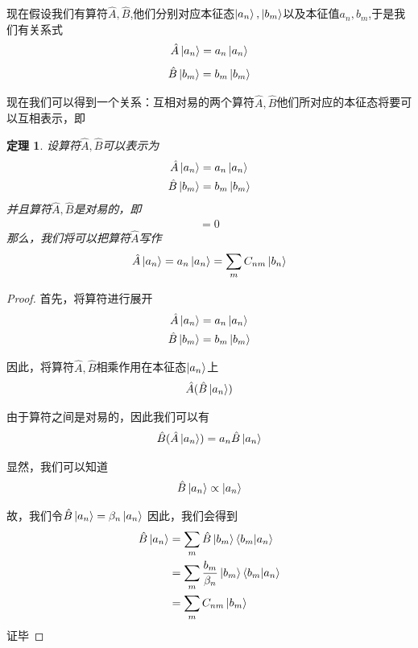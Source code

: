 \documentclass{article}
\newtheorem{theorem}{定理}
\begin{document}
现在假设我们有算符$\hat{A},\hat{B}$,他们分别对应本征态$\ket{a_n},\ket{b_m}$以及本征值$a_n,b_m$,于是我们有关系式
\[\hat{A}\ket{a_n}=a_n\ket{a_n}\]
\[\hat{B}\ket{b_m}=b_m\ket{b_m}\]

现在我们可以得到一个关系：互相对易的两个算符$\hat{A},\hat{B}$他们所对应的本征态将要可以互相表示，即
\begin{theorem}
    设算符$\hat{A},\hat{B}$可以表示为
    \begin{align*}
        \hat{A}\ket{a_n}&=a_n\ket{a_n}\\
        \hat{B}\ket{b_m}&=b_m\ket{b_m}
    \end{align*}
    并且算符$\hat{A},\hat{B}$是对易的，即
    \begin{align*}
        [\hat{A},\hat{B}]=0
    \end{align*}
    那么，我们将可以把算符$\hat{A}$写作
    \begin{align*}
        \hat{A}\ket{a_n}=a_n\ket{a_n}=\sum_{m}C_{nm}\ket{b_n}
    \end{align*}
\end{theorem}



\begin{proof}
    首先，将算符进行展开
    \begin{align*}
        \hat{A}\ket{a_n}&=a_n\ket{a_n}\\
        \hat{B}\ket{b_m}&=b_m\ket{b_m}
    \end{align*}
    
    因此，将算符$\hat{A},\hat{B}$相乘作用在本征态$\ket{a_n}$上
    \begin{align*}
        \hat{A}(\hat{B}\ket{a_n})
    \end{align*}

    由于算符之间是对易的，因此我们可以有
    \begin{align*}
        \hat{B}(\hat{A}\ket{a_n})=a_n\hat{B}\ket{a_n}
    \end{align*}
    
    显然，我们可以知道
    \begin{align*}
        \hat{B}\ket{a_n}\propto \ket{a_n}
    \end{align*}
    
    故，我们令$\displaystyle\hat{B}\ket{a_n}=\beta_n\ket{a_n}$
    因此，我们会得到
    \begin{align*}
        \hat{B}\ket{a_n}&=\sum_{m}\hat{B}\ket{b_m}\braket{b_m}{a_n}\\
        &=\sum_{m}\frac{b_m}{\beta_n}\ket{b_m}\braket{b_m}{a_n}\\
        &=\sum_{m}C_{nm}\ket{b_m}
    \end{align*}
    证毕
\end{proof}
\end{document}
